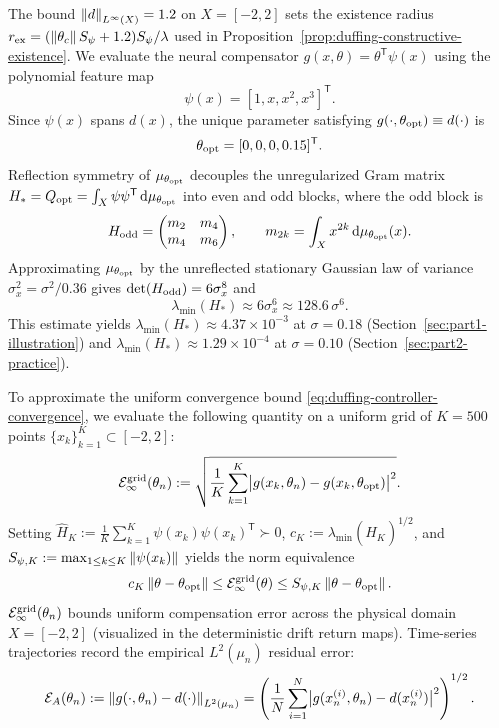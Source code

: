 The bound $\left\lVert d\right\rVert_{L^\infty(X)} = 1.2$ on $X=[-2,2]$ sets the existence radius $r_{\rm ex} = (\left\lVert \theta_c\right\rVert S_\psi + 1.2)S_\psi/\lambda$ used in Proposition~\ref{prop:duffing-constructive-existence}. We evaluate the neural compensator $g(x,\theta) = \theta^{\mathsf T}\psi(x)$ using the polynomial feature map
\begin{equation}
    \psi(x) = [1, x, x^2, x^3]^{\mathsf T}.
\end{equation}
Since $\psi(x)$ spans $d(x)$, the unique parameter satisfying $g(\cdot,\theta_{\rm opt}) \equiv d(\cdot)$ is
\begin{equation}
    \theta_{\rm opt} = [0, 0, 0, 0.15]^{\mathsf T}.
\end{equation}
Reflection symmetry of $\mu_{\theta_{\rm opt}}$ decouples the unregularized Gram matrix $H_* = Q_{\rm opt} = \int_X \psi\psi^{\mathsf T}\,\mathrm{d}\mu_{\theta_{\rm opt}}$ into even and odd blocks, where the odd block is
\[
  H_{\rm odd} = \begin{pmatrix} m_2 & m_4 \\ m_4 & m_6 \end{pmatrix}, \qquad m_{2k} = \int_X x^{2k}\,\mathrm{d}\mu_{\theta_{\rm opt}}(x).
\]
Approximating $\mu_{\theta_{\rm opt}}$ by the unreflected stationary Gaussian law of variance $\sigma_x^2 = \sigma^2/0.36$ gives $\det(H_{\rm odd}) = 6\sigma_x^8$ and
\begin{equation}
    \lambda_{\min}(H_*) \approx 6\sigma_x^6 \approx 128.6\,\sigma^6.
    \label{eq:duffing-sigma6-law}
\end{equation}
This estimate yields $\lambda_{\min}(H_*) \approx 4.37\times 10^{-3}$ at $\sigma=0.18$ (Section~\ref{sec:part1-illustration}) and $\lambda_{\min}(H_*) \approx 1.29\times 10^{-4}$ at $\sigma=0.10$ (Section~\ref{sec:part2-practice}).

To approximate the uniform convergence bound \eqref{eq:duffing-controller-convergence}, we evaluate the following quantity on a uniform grid of $K=500$ points $\{x_k\}_{k=1}^K \subset [-2, 2]$:
\begin{equation}
    \mathcal{E}_\infty^{\rm grid}(\theta_n) := \sqrt{\frac{1}{K}\sum_{k=1}^K \bigl|g(x_k, \theta_n) - g(x_k, \theta_{\rm opt})\bigr|^2}.
\end{equation}
Setting $\widehat H_K:=\frac{1}{K}\sum_{k=1}^K\psi(x_k)\psi(x_k)^{\mathsf T} \succ 0$, $c_K:=\lambda_{\min}(\widehat H_K)^{1/2}$, and $S_{\psi,K}:=\max_{1\le k\le K}\left\lVert \psi(x_k)\right\rVert$ yields the norm equivalence
\begin{equation}
    c_K\left\lVert \theta-\theta_{\rm opt}\right\rVert \le \mathcal{E}_\infty^{\rm grid}(\theta) \le S_{\psi,K}\left\lVert \theta-\theta_{\rm opt}\right\rVert.
\end{equation}
$\mathcal{E}_\infty^{\rm grid}(\theta_n)$ bounds uniform compensation error across the physical domain $X=[-2, 2]$ (visualized in the deterministic drift return maps). Time-series trajectories record the empirical $L^2(\mu_n)$ residual error:
\begin{equation}
    \mathcal{E}_A(\theta_n) := \left\lVert g(\cdot, \theta_n) - d(\cdot)\right\rVert_{L^2(\mu_n)} = \left(\frac{1}{N}\sum_{i=1}^N \bigl|g(x_n^{(i)}, \theta_n) - d(x_n^{(i)})\bigr|^2\right)^{1/2}.
    \label{eq:empirical-compensation-error}
\end{equation}

